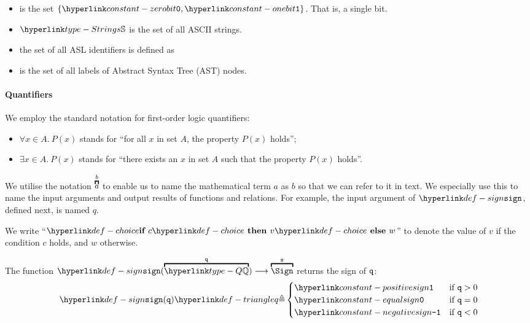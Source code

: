\begin{itemize}
\item {}
is the set $\{\zerobit,\onebit\}$. That is, a single bit.

\item {}$\Strings$ is the set of all ASCII strings.

\item the set of all ASL identifiers is defined as 

\item {}
is the set of all labels of Abstract Syntax Tree (AST) nodes.
\end{itemize}

\paragraph{Quantifiers}
We employ the standard notation for first-order logic quantifiers:
\begin{itemize}
  \item $\forall x \in A.\ P(x)$ stands for ``for all $x$ in set $A$, the property $P(x)$ holds'';
  \item $\exists x \in A.\ P(x)$ stands for ``there exists an $x$ in set $A$ such that the property $P(x)$ holds''.
\end{itemize}

We utilise the notation $\overname{a}{b}$ to enable us to name the mathematical term $a$ as $b$ so that
we can refer to it in text. We especially use this to name the input arguments and
output results of functions and relations. For example, the input argument of $\sign$,
defined next, is named $q$.

We write ``$\ifthenelseop[H]{c}{v}{w}$'' to denote the value of $v$ if the condition $c$ holds, and $w$ otherwise.

\hypertarget{def-sign}{}
\begin{definition}
\hypertarget{constant-positivesign}{}
\hypertarget{constant-negativesign}{}
\hypertarget{constant-equalsign}{}

The function $\sign(\overname{\Q}{\vq}) \aslto \overname{\Sign}{\vs}$ returns the sign of $\texttt{q}$:
\[
\sign(\vq) \triangleq \begin{cases}
  \positivesign & \text{if }\vq > 0\\
  \equalsign & \text{if }\vq = 0\\
  \negativesign & \text{if }\vq < 0
\end{cases}
\]
\end{definition}


